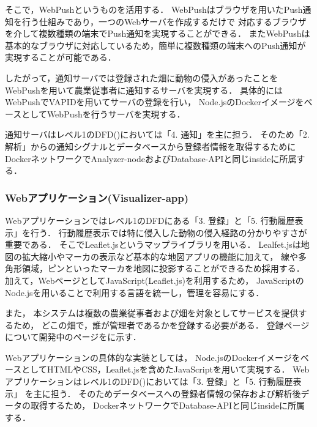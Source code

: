 \documentclass[12pt]{honka_v1}
\begin{document}
そこで，WebPushというものを活用する．
WebPushはブラウザを用いたPush通知を行う仕組みであり，一つのWebサーバを作成するだけで
対応するブラウザを介して複数種類の端末でPush通知を実現することができる．
またWebPushは基本的なブラウザに対応しているため，簡単に複数種類の端末へのPush通知が実現することが可能である．


したがって，通知サーバでは登録された畑に動物の侵入があったことをWebPushを用いて農業従事者に通知するサーバを実現する．
具体的には
WebPushでVAPIDを用いてサーバの登録を行い，
Node.jsのDockerイメージをベースとしてWebPushを行うサーバを実現する．

通知サーバはレベル1のDFD()においては「4. 通知」を主に担う．
そのため「2. 解析」からの通知シグナルとデータベースから登録者情報を取得するために
DockerネットワークでAnalyzer-nodeおよびDatabase-APIと同じinsideに所属する．



\subsubsection{Webアプリケーション(Visualizer-app)}
Webアプリケーションではレベル1のDFDにある「3. 登録」と「5. 行動履歴表示」を行う．
行動履歴表示では特に侵入した動物の侵入経路の分かりやすさが重要である．
そこでLeaflet.jsというマップライブラリを用いる．
Lealfet.jsは地図の拡大縮小やマーカの表示など基本的な地図アプリの機能に加えて，
線や多角形領域，ピンといったマーカを地図に投影することができるため採用する．
加えて，WebページとしてJavaScript(Leaflet.js)を利用するため，
JavaScriptのNode.jsを用いることで利用する言語を統一し，管理を容易にする．

また，
本システムは複数の農業従事者および畑を対象としてサービスを提供するため，
どこの畑で，誰が管理者であるかを登録する必要がある．
登録ページについて開発中のページをに示す．


Webアプリケーションの具体的な実装としては，
Node.jsのDockerイメージをベースとしてHTMLやCSS，Leaflet.jsを含めたJavaScriptを用いて実現する．
Webアプリケーションはレベル1のDFD()においては「3. 登録」と「5. 行動履歴表示」
を主に担う．
そのためデータベースへの登録者情報の保存および解析後データの取得するため，
DockerネットワークでDatabase-APIと同じinsideに所属する．
\end{document}
